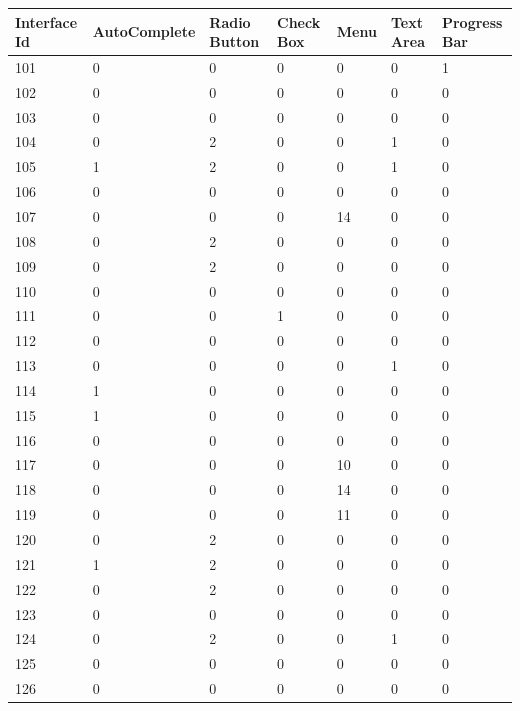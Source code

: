 \documentclass[12pt,a4paper]{report}
\begin{document}
\newpage
\begin{center}
\begin{tabular}{ | m{1.5cm} | m{1.5cm}| | m{1.5cm}|| m{1.5cm}| | m{1cm} | m{1.5cm}| | m{1.5cm}|}  
 \hline

\textbf{ Interface Id} &\textbf{ AutoComplete} &\textbf{ Radio Button} & \textbf{Check} \textbf{Box} & \textbf{Menu} & \textbf{Text Area} &\textbf{Progress Bar} \\  \hline
101 & 0 & 0 & 0 & 0 & 0	& 1  \\ \hline
102 & 0 & 0 & 0 & 0	& 0 & 0  \\ \hline
103 & 0 & 0 & 0 & 0 & 0 & 0  \\ \hline
104 & 0 & 2 & 0 & 0 & 1 & 0  \\ \hline
105 & 1 & 2 & 0 & 0 & 1 & 0  \\ \hline
106 & 0 & 0 & 0 & 0 & 0 & 0  \\ \hline
107 & 0 & 0 & 0 & 14 & 0 & 0  \\ \hline
108 & 0 & 2 & 0 & 0 & 0 & 0  \\ \hline
109 & 0 & 2 & 0 & 0 & 0 & 0  \\ \hline
110 & 0 & 0 & 0 & 0 & 0 & 0  \\ \hline
111 & 0 & 0 & 1& 0 & 0 & 0  \\ \hline
112 & 0 & 0& 0 & 0 & 0 & 0  \\ \hline
113 & 0 & 0 & 0 & 0 & 1 & 0     \\ \hline
114 & 1 & 0 &0 & 0 & 0 & 0  \\ \hline
115 & 1 &0 & 0 & 0 & 0 & 0  \\ \hline
116 & 0 & 0 & 0 &0 & 0 & 0  \\ \hline
117 & 0 & 0& 0 & 10 & 0 & 0  \\ \hline
118 & 0& 0 & 0 & 14 & 0 & 0  \\ \hline
119 & 0 & 0& 0 & 11 & 0 & 0  \\ \hline
120 & 0 & 2 &0 & 0 & 0 & 0  \\ \hline
121 & 1& 2 & 0 & 0 & 0 & 0   \\ \hline
122 & 0 & 2& 0 & 0 & 0 & 0  \\ \hline
123 & 0 & 0 & 0 & 0 & 0 & 0  \\ \hline
124 & 0 & 2& 0 & 0 & 1 & 0   \\ \hline
125 & 0& 0 & 0 & 0 & 0 & 0  \\ \hline
126 & 0 & 0& 0 & 0 & 0 & 0  \\ \hline
\end{tabular}
\end{center}
\newpage
\end{document}

